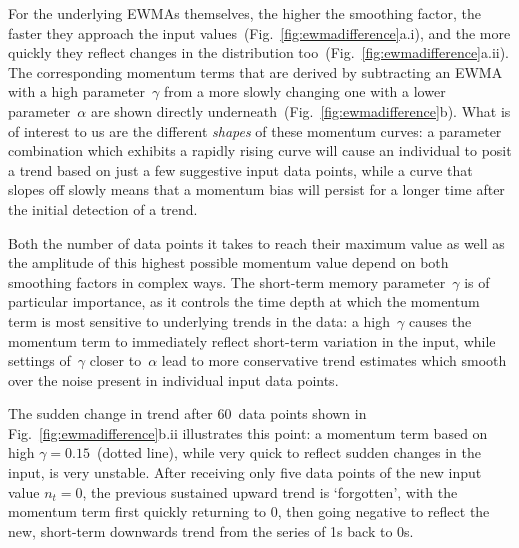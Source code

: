 For the underlying EWMAs themselves, the higher the smoothing factor, the faster they approach the input values~(Fig.~\ref{fig:ewmadifference}a.i), and the more quickly they reflect changes in the distribution too~(Fig.~\ref{fig:ewmadifference}a.ii). The corresponding momentum terms that are derived by subtracting an EWMA with a high parameter~$\gamma$ from a more slowly changing one with a lower parameter~$\alpha$ are shown directly underneath~(Fig.~\ref{fig:ewmadifference}b). What is of interest to us are the different \emph{shapes} of these momentum curves: a parameter combination which exhibits a rapidly rising curve will cause an individual to posit a trend based on just a few suggestive input data points, while a curve that slopes off slowly means that a momentum bias will persist for a longer time after the initial detection of a trend.

Both the number of data points it takes to reach their maximum value as well as the amplitude of this highest possible momentum value depend on both smoothing factors in complex ways. The short-term memory parameter~$\gamma$ is of particular importance, as it controls the time depth at which the momentum term is most sensitive to underlying trends in the data: a high~$\gamma$ causes the momentum term to immediately reflect short-term variation in the input, while settings of~$\gamma$ closer to~$\alpha$ lead to more conservative trend estimates which smooth over the noise present in individual input data points.

The sudden change in trend after 60~data points shown in Fig.~\ref{fig:ewmadifference}b.ii illustrates this point: a momentum term based on high $\gamma=0.15$~(dotted line), while very quick to reflect sudden changes in the input, is very unstable. After receiving only five data points of the new input value $n_t=0$, the previous sustained upward trend is `forgotten', with the momentum term first quickly returning to $0$, then going negative to reflect the new, short-term downwards trend from the series of 1s back to 0s. %


